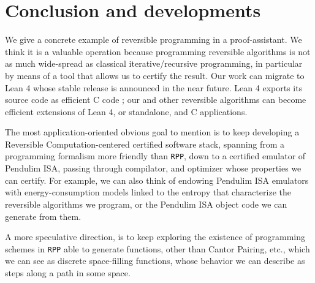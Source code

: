 \documentclass[runningheads]{llncs}
\newcommand{\CPP}{\textsf{C}\xspace}
\newcommand{\LEANFour}{\textsf{Lean 4}\xspace}
\newcommand{\PISA}{\textsf{Pendulim ISA}\xspace}
\begin{document}
\section{Conclusion and developments}
\label{section:Conclusion and developments}
We give a concrete example of reversible programming in a proof-assistant. We think it is a valuable operation because programming reversible algorithms is not as much wide-spread as classical iterative/recursive programming, in particular by means of a tool that allows us to certify the result.
Our work can migrate to \LEANFour whose stable release is announced in the near future. \LEANFour exports its source code as efficient \CPP code \cite{2021-LEAN4-MouraUllrich}; our and other reversible algorithms can become efficient extensions of \LEANFour, or standalone, and \CPP applications.

The most application-oriented obvious goal to mention is to keep developing a Reversible Computa\-tion-centered certified software stack, spanning from a programming formalism more friendly than \lstinline|RPP|, down to a certified emulator of \PISA, passing through compilator, and optimizer whose properties we can certify. For example, we can also think of endowing \PISA emulators with energy-consumption models linked to the entropy that characterize the reversible algorithms we program, or the \PISA object code we can generate from them.

A more speculative direction, is to keep exploring the existence of programming schemes in \lstinline|RPP| able to generate functions, other than Cantor Pairing, etc., which we can see as discrete space-filling functions, whose behavior we can describe as steps along a path in some space.




\end{document}
